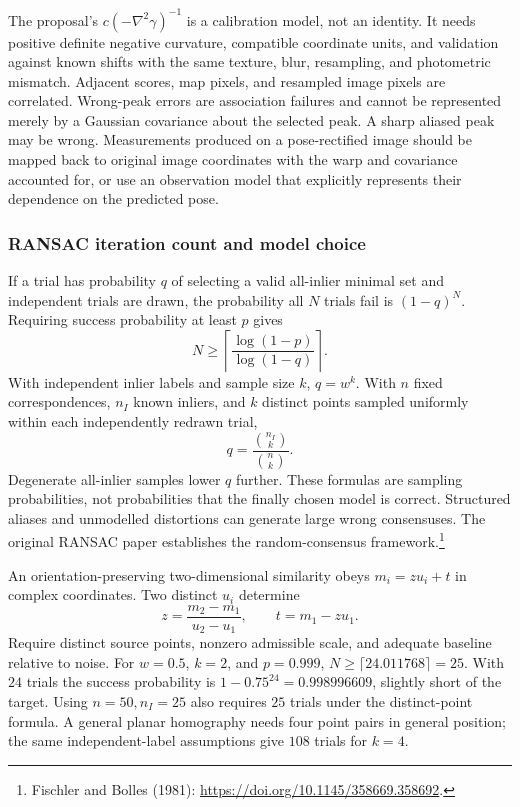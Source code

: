 The proposal's $c(-\nabla^2\gamma)^{-1}$ is a calibration model, not
an identity. It needs positive definite negative curvature, compatible
coordinate units, and validation against known shifts with the same
texture, blur, resampling, and photometric mismatch. Adjacent scores,
map pixels, and resampled image pixels are correlated. Wrong-peak errors
are association failures and cannot be represented merely by a Gaussian
covariance about the selected peak. A sharp aliased peak may be wrong.
Measurements produced on a pose-rectified image should be mapped back to
original image coordinates with the warp and covariance accounted for,
or use an observation model that explicitly represents their dependence
on the predicted pose.

\subsubsection{RANSAC iteration count and model choice}

If a trial has probability $q$ of selecting a valid all-inlier minimal
set and independent trials are drawn, the probability all $N$ trials
fail is $(1-q)^N$. Requiring success probability at least $p$ gives
\begin{equation}
 N\geq\left\lceil\frac{\log(1-p)}{\log(1-q)}\right\rceil.
 \label{eq:ransac-ceil}
\end{equation}
With independent inlier labels and sample size $k$, $q=w^k$.
With $n$ fixed correspondences, $n_I$ known inliers, and $k$ distinct
points sampled uniformly within each independently redrawn trial,
\begin{equation}
 q=\frac{\binom{n_I}{k}}{\binom n k}.
\end{equation}
Degenerate all-inlier samples lower $q$ further. These formulas are
sampling probabilities, not probabilities that the finally chosen model
is correct. Structured aliases and unmodelled distortions can generate
large wrong consensuses. The original RANSAC paper establishes the
random-consensus framework.\footnote{Fischler and Bolles (1981):
\url{https://doi.org/10.1145/358669.358692}.}

An orientation-preserving two-dimensional similarity obeys
$m_i=z u_i+t$ in complex coordinates. Two distinct $u_i$ determine
\begin{equation}
 z=\frac{m_2-m_1}{u_2-u_1},\qquad t=m_1-z u_1.
\end{equation}
Require distinct source points, nonzero admissible scale, and adequate
baseline relative to noise. For $w=0.5$, $k=2$, and $p=0.999$,
$N\geq\lceil24.011768\rceil=25$. With $24$ trials the success
probability is $1-0.75^{24}=0.998996609$, slightly short of the target.
Using $n=50,n_I=25$ also requires $25$ trials under the distinct-point
formula. A general planar homography needs four point pairs in general
position; the same independent-label assumptions give $108$ trials
for $k=4$.

